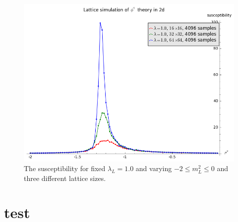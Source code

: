 \documentclass[12pt]{article}
\begin{document}
\begin{figure}[htbp]
  \centering
  \includegraphics[width=\textwidth]{figures/susceptibility-latticesize.png}
  \caption{The susceptibility for fixed $\lambda_L=1.0$ and varying
    $-2\leq m_L^2 \leq 0$ and three different lattice sizes.}
\end{figure}






\newpage
\appendix

\section{test}



 
\renewcommand{\refname}{Bibliography}

\end{document}

